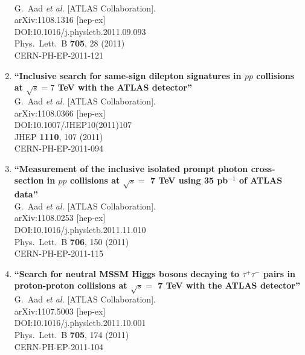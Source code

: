 \documentclass{article}
\begin{document}
\begin{enumerate}
  \\{}G.~Aad {\it et al.} [ATLAS Collaboration].
  \\{}arXiv:1108.1316 [hep-ex]
  \\{}DOI:10.1016/j.physletb.2011.09.093
  \\{}Phys.\ Lett.\ B {\bf 705}, 28 (2011)
  \\{}CERN-PH-EP-2011-121
\item%
{\bf ``Inclusive search for same-sign dilepton signatures in $pp$ collisions at $\sqrt{s}=7$ TeV with the ATLAS detector''}
  \\{}G.~Aad {\it et al.} [ATLAS Collaboration].
  \\{}arXiv:1108.0366 [hep-ex]
  \\{}DOI:10.1007/JHEP10(2011)107
  \\{}JHEP {\bf 1110}, 107 (2011)
  \\{}CERN-PH-EP-2011-094
\item%
{\bf ``Measurement of the inclusive isolated prompt photon cross-section in $pp$ collisions at $\sqrt{s}=$ 7 TeV using 35 pb$^{-1}$ of ATLAS data''}
  \\{}G.~Aad {\it et al.} [ATLAS Collaboration].
  \\{}arXiv:1108.0253 [hep-ex]
  \\{}DOI:10.1016/j.physletb.2011.11.010
  \\{}Phys.\ Lett.\ B {\bf 706}, 150 (2011)
  \\{}CERN-PH-EP-2011-115
\item%
{\bf ``Search for neutral MSSM Higgs bosons decaying to $\tau^{+}\tau^-$ pairs in proton-proton collisions at $\sqrt{s}=$ 7 TeV with the ATLAS detector''}
  \\{}G.~Aad {\it et al.} [ATLAS Collaboration].
  \\{}arXiv:1107.5003 [hep-ex]
  \\{}DOI:10.1016/j.physletb.2011.10.001
  \\{}Phys.\ Lett.\ B {\bf 705}, 174 (2011)
  \\{}CERN-PH-EP-2011-104

\end{enumerate}
\end{document}

